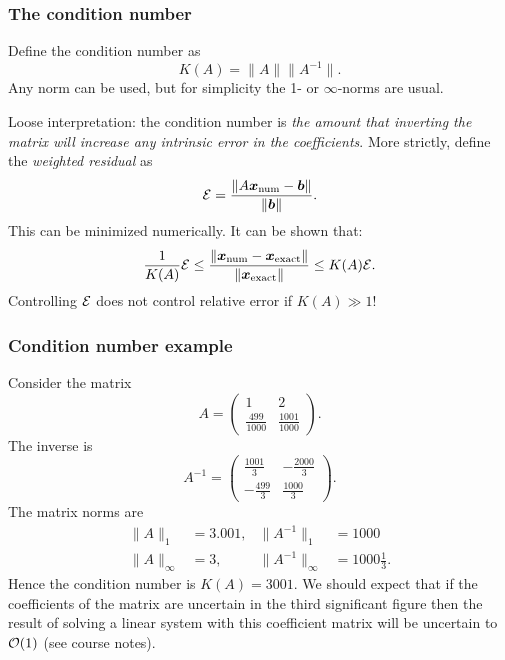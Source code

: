 \documentclass{beamer}
\newcommand{\bb}{{\boldsymbol{b}}}
\newcommand{\bx}{{\boldsymbol{x}}}
\begin{document}
 \begin{frame}
   \frametitle{The condition number}

   Define the condition number as
   \begin{equation*}
     K(A) = \| A \| \| A^{-1} \|.
   \end{equation*}
   Any norm can be used, but for simplicity the 1- or $\infty$-norms
   are usual. \pause

   \begin{overlayarea}{\textwidth}{0.5\textheight}
     {
       Loose interpretation: the condition number is
       \emph{the amount that inverting the matrix will increase any
         intrinsic error in the coefficients}.
     }
     {
       More strictly, define the \emph{weighted residual} as
       \begin{equation*}
         {\cal E} = \frac{\| A \bx_{\text{num}} - \bb \|}{\| \bb \|}.
       \end{equation*}
       This can be minimized numerically. \pause It can be shown that:
       \begin{equation*}
         \frac{1}{K(A)} {\cal E} \le \frac{ \| \bx_{\text{num}} -
           \bx_{\text{exact}} \|}{\| \bx_{\text{exact}} \|} \le  K(A)
         {\cal E} .
       \end{equation*}
       Controlling ${\cal E}$ does not control relative error if $K(A)
       \gg 1$!
     }
   \end{overlayarea}

 \end{frame}

 \begin{frame}
   \frametitle{Condition number example}

   Consider the matrix
   \begin{equation*}
     A =
     \begin{pmatrix}
       1 & 2 \\
       \tfrac{499}{1000} & \tfrac{1001}{1000}
     \end{pmatrix}.
   \end{equation*} \pause
   The inverse is
   \begin{equation*}
     A^{-1} =
     \begin{pmatrix}
       \tfrac{1001}{3} & -\tfrac{2000}{3}  \\
       -\tfrac{499}{3} & \tfrac{1000}{3}
     \end{pmatrix}.
   \end{equation*} \pause
   The matrix norms are
   \begin{align*}
     \| A \|_1 & = 3.001, & \| A^{-1} \|_1 & = 1000 \\
     \| A \|_{\infty} & = 3, & \| A^{-1} \|_{\infty} & = 1000
     \tfrac{1}{3}.
   \end{align*} \pause
   Hence the condition number is $K(A) = 3001$. We should expect that
   if the coefficients of the matrix are uncertain in the third
   significant figure then the result of solving a linear system with
   this coefficient matrix will be uncertain to ${\cal O}(1)$ (see
   course notes).

 \end{frame}
\end{document}
